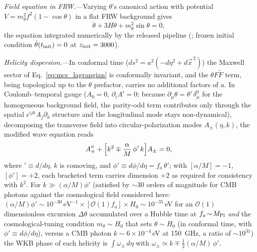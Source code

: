 \documentclass[aps,prd,twocolumn,superscriptaddress,showpacs,preprintnumbers,nofootinbib,longbibliography,floatfix]{revtex4-2}
\begin{document}
\textit{Field equation in FRW.}---Varying $\theta$'s canonical action
with potential $V = m_\theta^2 f^2 (1-\cos\theta)$ in a flat FRW
background gives
\begin{equation}
\ddot\theta + 3H\dot\theta + m_\theta^2 \sin\theta = 0,
\label{eq:theta_eom_frw}
\end{equation}
the equation integrated numerically by the released pipeline
(;
frozen initial condition $\dot\theta(t_{\rm init})=0$ at
$z_{\rm init}=3000$).

\textit{Helicity dispersion.}---In conformal time
($ds^2 = a^2(-d\eta^2 + d\vec x^{\,2})$) the Maxwell sector of
Eq.~\eqref{eq:mcs_lagrangian} is conformally invariant, and the
$\theta F\tilde F$ term, being topological up to the $\theta$ prefactor,
carries no additional factors of $a$. In Coulomb--temporal gauge
($A_0=0$, $\partial_i A^i=0$; because $\partial_\mu\theta =
\theta'\,\delta^0_\mu$ for the homogeneous background field, the
parity-odd term contributes only through the spatial
$\epsilon^{ijk}A_j\partial_k$ structure and the longitudinal mode stays
non-dynamical), decomposing
the transverse field into circular-polarization modes
$A_\pm(\eta,k)$, the modified wave equation reads
\begin{equation}
A_\pm'' + \Bigl[k^2 \mp \frac{\alpha}{M}\,\phi'\,k\Bigr] A_\pm = 0,
\label{eq:helicity_dispersion}
\end{equation}
where $' \equiv d/d\eta$, $k$ is comoving, and $\phi'\equiv d\phi/d\eta = f_a\,\theta'$;
with $[\alpha/M]=-1$, $[\phi']=+2$, each bracketed term carries dimension
$+2$ as required for consistency with $k^2$. For
$k \gg (\alpha/M)\phi'$ (satisfied by ${\sim}30$ orders of magnitude
for CMB photons against the cosmological field considered here:
$(\alpha/M)\phi' \sim 10^{-30}\,\text{eV}^{-1}\times
[\mathcal{O}(1) f_a]\times H_0 \sim 10^{-35}\,$eV for an $\mathcal{O}(1)$
dimensionless excursion $\Delta\theta$ accumulated over a Hubble time
at $f_a\!\sim\!M_{\rm Pl}$ \emph{and} the cosmological-tuning condition
$m_\theta\sim H_0$ that sets $\dot\theta\sim H_0$ (in conformal time,
with $\phi'\equiv d\phi/d\eta$), versus a CMB photon
$k \sim 6\times 10^{-4}\,$eV at 150~GHz, a ratio of
${\sim}10^{31}$) the WKB
phase of each helicity is
$\int\!\omega_\pm\,d\eta$ with
$\omega_\pm \simeq k \mp \tfrac{1}{2}(\alpha/M)\,\phi'$.
\end{document}
